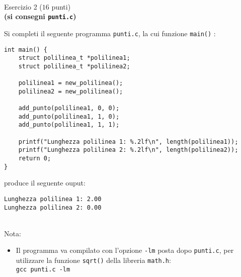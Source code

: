 \documentclass[12pt]{article}
\begin{document}
\mbox{}\\
\begin{center}{\Large Esercizio 2} ($16$ punti)\\
  \textbf{(si consegni \texttt{punti.c})}\end{center}
Si completi il seguente programma \texttt{punti.c}, la cui funzione \texttt{main()} :
\begin{center}
\begin{lstlisting}[language=myC]
int main() {
    struct polilinea_t *polilinea1;
    struct polilinea_t *polilinea2;

    polilinea1 = new_polilinea();
    polilinea2 = new_polilinea();

    add_punto(polilinea1, 0, 0);
    add_punto(polilinea1, 1, 0);
    add_punto(polilinea1, 1, 1);

    printf("Lunghezza polilinea 1: %.2lf\n", length(polilinea1));
    printf("Lunghezza polilinea 2: %.2lf\n", length(polilinea2));
    return 0;
}
\end{lstlisting}
\end{center}
produce il seguente ouput:
\begin{mdframed}[backgroundcolor=lightgrey] 
\begin{verbatim}
Lunghezza polilinea 1: 2.00
Lunghezza polilinea 2: 0.00
\end{verbatim}
\end{mdframed}

\mbox{}\\
Nota:
\begin{itemize}
\item Il programma va compilato con l'opzione \texttt{-lm} posta dopo \texttt{punti.c}, per utilizzare la funzione \texttt{sqrt()} della libreria \texttt{math.h}:\\
 \texttt{gcc punti.c -lm}
\end{itemize}
\end{document}
